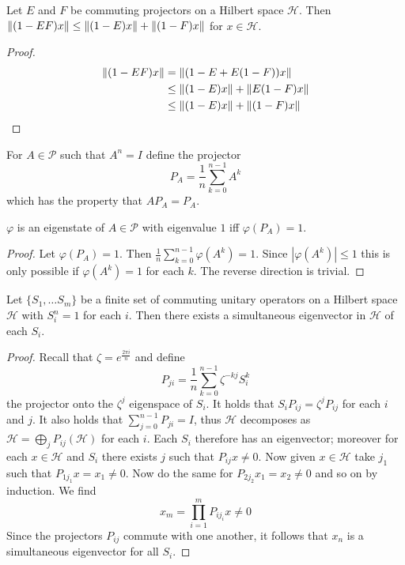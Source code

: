 \documentclass[11pt]{amsart}
\begin{document}
\begin{lem}
    Let $E$ and $F$ be commuting projectors on a Hilbert space $\mathcal H$. Then  $\left\lVert (1-EF)x\right\rVert\leq\left\lVert (1-E)x\right\rVert+\left\lVert (1-F)x\right\rVert$ for $x\in\mathcal H$.
    \begin{proof}
        \begin{align*}
            \left\lVert (1-EF)x\right\rVert&=\left\lVert (1-E+E(1-F))x\right\rVert\\
            &\leq \left\lVert (1-E)x\right\rVert+\left\lVert E(1-F)x\right\rVert\\
            & \leq  \left\lVert (1-E)x\right\rVert+\left\lVert (1-F)x\right\rVert
        \end{align*}
    \end{proof}
\end{lem}
\begin{defn}
    For $A\in\mathcal P$ such that $A^n= I$ define the projector 
    \[
        P_A=\frac{1}{n}\sum_{k=0}^{n-1}A^k
    \]
    which has the property that $AP_A=P_A$.
\end{defn}
\begin{lem}\label{lem: eigenstates from projectors}
    $\varphi$ is an eigenstate of $A\in \mathcal P$ with eigenvalue $1$ iff $\varphi(P_A)=1$. 
    \begin{proof}
        Let $\varphi(P_A)=1$. Then $\frac{1}{n}\sum_{k=0}^{n-1}\varphi(A^k)=1$. Since $|\varphi(A^k)|\leq1$ this is only possible if $\varphi(A^k)=1$ for each $k$. The reverse direction is trivial. 
    \end{proof}
\end{lem}
\begin{prop}\label{prop: finite order Paulis have eigenstates}
    Let $\{S_1,\ldots S_m\}$ be a finite set of commuting unitary operators on a Hilbert space $\mathcal H$ with $S_i^n=1$ for each $i$. Then there exists a simultaneous eigenvector in $\mathcal H$ of each $S_i$. 
    \begin{proof}
        Recall that $\zeta=e^{\frac{2\pi i}{n}}$ and define 
        \[
            P_{ji}=\frac{1}{n}\sum_{k=0}^{n-1}\zeta^{-kj}S^k_i
        \]
        the projector onto the $\zeta^j$ eigenspace of $S_i$. It holds that $S_iP_{ij}=\zeta^jP_{ij}$ for each $i$ and $j$. It also holds that $\sum_{j=0}^{n-1}P_{ji}=I$, thus $\mathcal H$ decomposes as $\mathcal H=\bigoplus_j P_{ij}(\mathcal H)$ for each $i$. Each $S_i$ therefore has an eigenvector; moreover for each $x\in \mathcal H$ and $S_i$ there exists $j$ such that $P_{ij}x\neq 0$. Now given $x\in \mathcal H$ take $j_1$ such that $P_{1j_1}x=x_1\neq0$. Now do the same for $P_{2j_2}x_1=x_2\neq0$ and so on by induction. We find
        \[
            x_m=\prod_{i=1}^mP_{ij_i}x\neq 0
        \]
        Since the projectors $P_{ij}$ commute with one another, it follows that $x_n$ is a simultaneous eigenvector for all $S_i$. 
    \end{proof}
\end{prop}
\end{document}
